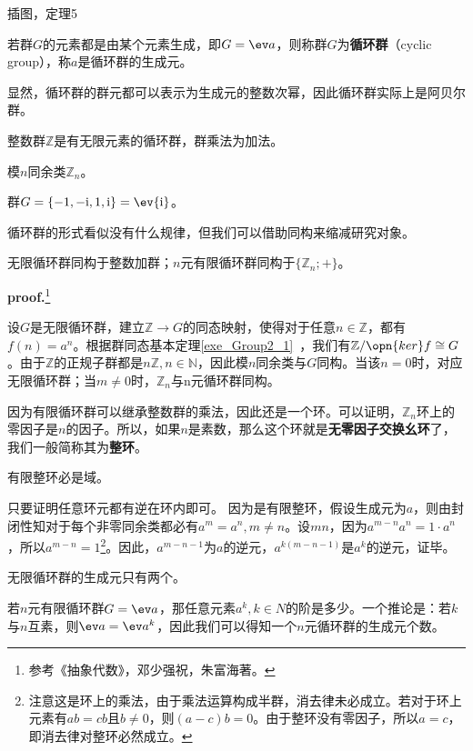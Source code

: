 
\begin{issues}
\issueTODO 插图，定理5
\end{issues}

\begin{definition}{}
若群$G$的元素都是由某个元素生成，即$G=\ev  a$，则称群$G$为\textbf{循环群}（cyclic group），称$a$是循环群的生成元。
\end{definition}

显然，循环群的群元都可以表示为生成元的整数次幂，因此循环群实际上是阿贝尔群。
\begin{example}{}
整数群$\mathbb Z$是有无限元素的循环群，群乘法为加法。
\end{example}
\begin{example}{}
模$n$同余类$\mathbb Z_n$。
\end{example}
\begin{example}{}
群$G=\{-1,-\mathrm i,1,\mathrm i\}=\ev {\mathrm i}$。
\end{example}
循环群的形式看似没有什么规律，但我们可以借助同构来缩减研究对象。
\begin{theorem}{}
无限循环群同构于整数加群；$n$元有限循环群同构于$\{\mathbb Z_n;+\}$。
\end{theorem}
\textbf{proof.}\footnote{参考《抽象代数》，邓少强祝，朱富海著。}

设$G$是无限循环群，建立$\mathbb Z\rightarrow G$的同态映射，使得对于任意$n\in \mathbb Z$，都有$f(n)=a^n$。根据群同态基本定理\autoref{exe_Group2_1}~，我们有$\mathbb Z/\opn{ker}f\cong G$。由于$\mathbb Z$的正规子群都是$n\mathbb Z,n\in \mathbb N$，因此模$n$同余类与$G$同构。当该$n=0$时，对应无限循环群；当$m\neq 0$时，$\mathbb Z_n$与n元循环群同构。

因为有限循环群可以继承整数群的乘法，因此还是一个环。可以证明，$\mathbb Z_n$环上的零因子是$n$的因子。所以，如果$n$是素数，那么这个环就是\textbf{无零因子交换幺环}了，我们一般简称其为\textbf{整环}。
\begin{theorem}{}
有限整环必是域。
\end{theorem}
只要证明任意环元都有逆在环内即可。
因为是有限整环，假设生成元为$a$，则由封闭性知对于每个非零同余类都必有$a^m=a^n,m\neq n$。设$m n$，因为$a^{m-n}a^n=1\cdot a^n$，所以$a^{m-n}=1$\footnote{注意这是环上的乘法，由于乘法运算构成半群，消去律未必成立。若对于环上元素有$ab=cb$且$b\neq 0$，则$(a-c)b=0$。由于整环没有零因子，所以$a=c$，即消去律对整环必然成立。}。因此，$a^{m-n-1}$为$a$的逆元，$a^{k(m-n-1)}$是$a^k$的逆元，证毕。
\begin{exercise}{}
无限循环群的生成元只有两个。
\end{exercise}
\begin{exercise}{}
若$n$元有限循环群$G=\ev a$，那任意元素$a^k,k\in N$的阶是多少。一个推论是：若$k$与$n$互素，则$\ev a=\ev a^k$，因此我们可以得知一个$n$元循环群的生成元个数。
\end{exercise}
